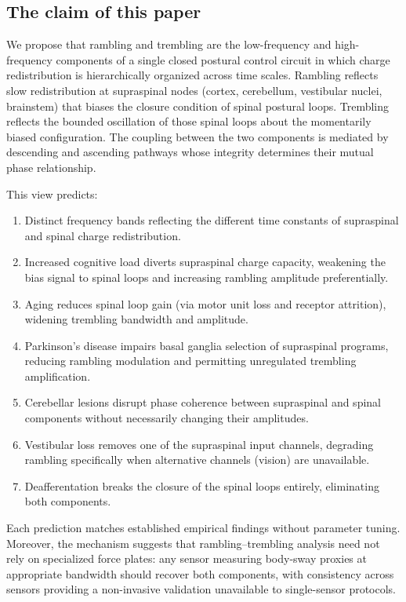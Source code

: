 \documentclass[11pt,twocolumn,a4paper]{article}
\theoremstyle{definition}
\theoremstyle{remark}
\begin{document}
\subsection{The claim of this paper}

We propose that rambling and trembling are the low-frequency and
high-frequency components of a single closed postural control
circuit in which charge redistribution is hierarchically organized
across time scales. Rambling reflects slow redistribution at
supraspinal nodes (cortex, cerebellum, vestibular nuclei,
brainstem) that biases the closure condition of spinal postural
loops. Trembling reflects the bounded oscillation of those spinal
loops about the momentarily biased configuration. The coupling
between the two components is mediated by descending and ascending
pathways whose integrity determines their mutual phase relationship.

This view predicts:
\begin{enumerate}[leftmargin=*,itemsep=1pt]
\item Distinct frequency bands reflecting the different time
constants of supraspinal and spinal charge redistribution.
\item Increased cognitive load diverts supraspinal charge capacity,
weakening the bias signal to spinal loops and increasing rambling
amplitude preferentially.
\item Aging reduces spinal loop gain (via motor unit loss and
receptor attrition), widening trembling bandwidth and amplitude.
\item Parkinson's disease impairs basal ganglia selection of
supraspinal programs, reducing rambling modulation and permitting
unregulated trembling amplification.
\item Cerebellar lesions disrupt phase coherence between supraspinal
and spinal components without necessarily changing their amplitudes.
\item Vestibular loss removes one of the supraspinal input channels,
degrading rambling specifically when alternative channels (vision)
are unavailable.
\item Deafferentation breaks the closure of the spinal loops
entirely, eliminating both components.
\end{enumerate}

Each prediction matches established empirical findings without
parameter tuning. Moreover, the mechanism suggests that
rambling--trembling analysis need not rely on specialized force
plates: any sensor measuring body-sway proxies at appropriate
bandwidth should recover both components, with consistency across
sensors providing a non-invasive validation unavailable to
single-sensor protocols.
\end{document}
